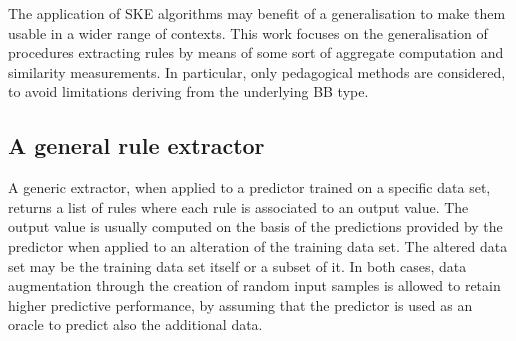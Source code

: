 \documentclass[
]{ceurart}
\begin{document}
The application of SKE algorithms may benefit of a generalisation to make them usable in a wider range of contexts.
%
This work focuses on the generalisation of procedures extracting rules by means of some sort of aggregate computation and similarity measurements.
%
In particular, only pedagogical methods are considered, to avoid limitations deriving from the underlying BB type. %
%
\subsection{A general rule extractor}

%
%
%

A generic extractor, when applied to a predictor trained on a specific data set, returns a list of rules where each rule is associated to an output value.
%
The output value is usually computed on the basis of the predictions provided by the predictor when applied to an alteration of the training data set.
%
The altered data set may be the training data set itself or a subset of it.
%
In both cases, data augmentation through the creation of random input samples is allowed to retain higher predictive performance, by assuming that the predictor is used as an oracle to predict also the additional data.
\end{document}
